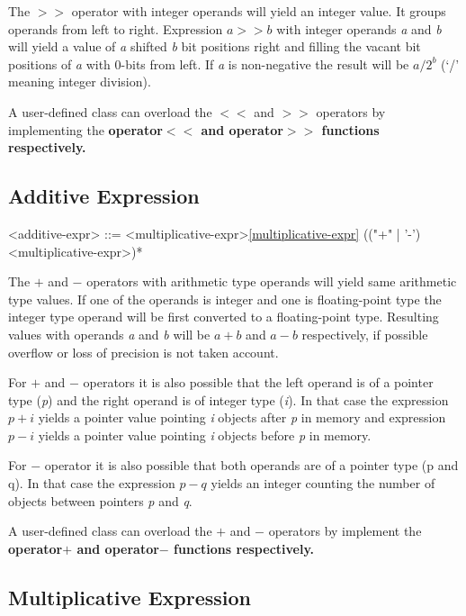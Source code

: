 \documentclass[a4paper,oneside,11pt]{article}
\begin{document}
The $>>$ operator with integer operands will yield an integer value. It groups operands from left to right.
Expression $a >> b$ with integer operands \emph{a} and \emph{b} will yield a value of \emph{a} shifted \emph{b} bit positions right and
filling the vacant bit positions of \emph{a} with 0-bits from left.
If \emph{a} is non-negative the result will be $a / 2^b$ (`/' meaning integer division).

A user-defined class can overload the $<<$ and $>>$ operators by implementing the \bf{operator$<<$} and \bf{operator$>>$} functions respectively.

\subsection{Additive Expression}

\begin{grammar}
\label{additive-expr}<additive-expr> ::= <multiplicative-expr>\ref{multiplicative-expr} (("+" | '-') <multiplicative-expr>)*
\end{grammar}

The $+$ and $-$ operators with arithmetic type operands will yield same arithmetic type values.
If one of the operands is integer and one is floating-point type the integer type operand will be first converted to a floating-point type.
Resulting values with operands \emph{a} and \emph{b} will be $a + b$ and $a - b$ respectively,
if possible overflow or loss of precision is not taken account.

For $+$ and $-$ operators it is also possible that the left operand is of a pointer type (\emph{p}) and the right operand is of integer type (\emph{i}).
In that case the expression $p+i$ yields a pointer value pointing \emph{i} objects after \emph{p} in memory and
expression $p-i$ yields a pointer value pointing \emph{i} objects before \emph{p} in memory.

For $-$ operator it is also possible that both operands are of a pointer type (p and q).
In that case the expression $p-q$ yields an integer counting the number of objects between pointers \emph{p} and \emph{q}.

A user-defined class can overload the $+$ and $-$ operators by implement
the \bf{operator$+$} and \bf{operator$-$} functions respectively.

\subsection{Multiplicative Expression}
\end{document}
